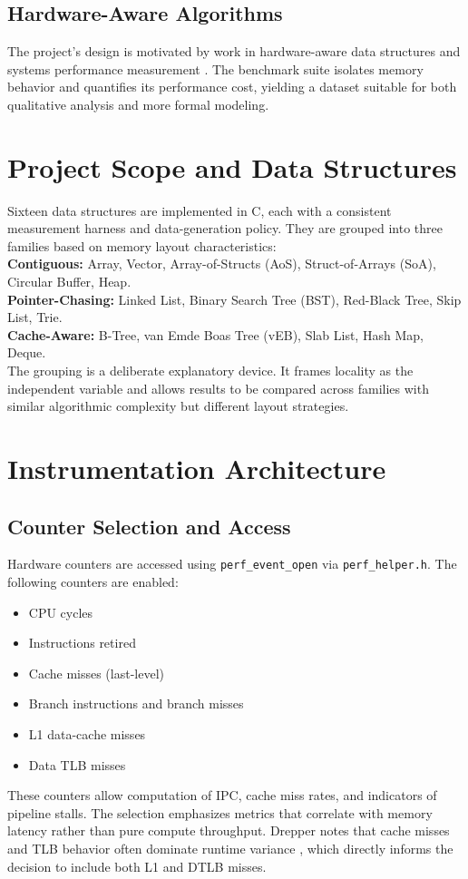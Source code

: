 \documentclass[11pt]{article}
\begin{document}
\subsection{Hardware-Aware Algorithms}
The project's design is motivated by work in hardware-aware data structures and systems performance measurement \citep{patterson2017}. The benchmark suite isolates memory behavior and quantifies its performance cost, yielding a dataset suitable for both qualitative analysis and more formal modeling.

\section{Project Scope and Data Structures}
Sixteen data structures are implemented in C, each with a consistent measurement harness and data-generation policy. They are grouped into three families based on memory layout characteristics:\\

\textbf{Contiguous:} Array, Vector, Array-of-Structs (AoS), Struct-of-Arrays (SoA), Circular Buffer, Heap.\\
\textbf{Pointer-Chasing:} Linked List, Binary Search Tree (BST), Red-Black Tree, Skip List, Trie.\\
\textbf{Cache-Aware:} B-Tree, van Emde Boas Tree (vEB), Slab List, Hash Map, Deque.\\

The grouping is a deliberate explanatory device. It frames locality as the independent variable and allows results to be compared across families with similar algorithmic complexity but different layout strategies.

\section{Instrumentation Architecture}
\subsection{Counter Selection and Access}
Hardware counters are accessed using \texttt{perf\_event\_open} via \texttt{perf\_helper.h}. The following counters are enabled:
\begin{itemize}
    \item CPU cycles
    \item Instructions retired
    \item Cache misses (last-level)
    \item Branch instructions and branch misses
    \item L1 data-cache misses
    \item Data TLB misses
\end{itemize}
These counters allow computation of IPC, cache miss rates, and indicators of pipeline stalls. The selection emphasizes metrics that correlate with memory latency rather than pure compute throughput. Drepper notes that cache misses and TLB behavior often dominate runtime variance \citep{drepper2007}, which directly informs the decision to include both L1 and DTLB misses.
\end{document}
